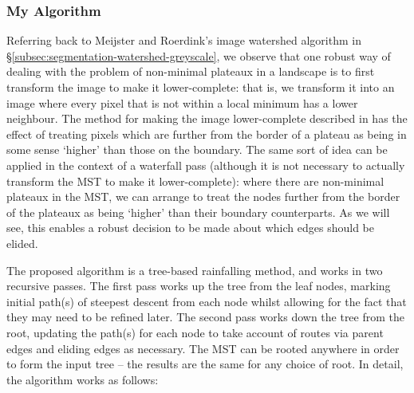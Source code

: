 \subsubsection{My Algorithm}
\label{subsubsec:segmentation-waterfall-myalgorithm}

Referring back to Meijster and Roerdink's image watershed algorithm in \S\ref{subsec:segmentation-watershed-greyscale}, we observe that one robust way of dealing with the problem of non-minimal plateaux in a landscape is to first transform the image to make it lower-complete: that is, we transform it into an image where every pixel that is not within a local minimum has a lower neighbour. The method for making the image lower-complete described in \cite{meijster98} has the effect of treating pixels which are further from the border of a plateau as being in some sense `higher' than those on the boundary. The same sort of idea can be applied in the context of a waterfall pass (although it is not necessary to actually transform the MST to make it lower-complete): where there are non-minimal plateaux in the MST, we can arrange to treat the nodes further from the border of the plateaux as being `higher' than their boundary counterparts. As we will see, this enables a robust decision to be made about which edges should be elided.

The proposed algorithm is a tree-based rainfalling method, and works in two recursive passes. The first pass works up the tree from the leaf nodes, marking initial path(s) of steepest descent from each node whilst allowing for the fact that they may need to be refined later. The second pass works down the tree from the root, updating the path(s) for each node to take account of routes via parent edges and eliding edges as necessary. The MST can be rooted anywhere in order to form the input tree -- the results are the same for any choice of root. In detail, the algorithm works as follows:

